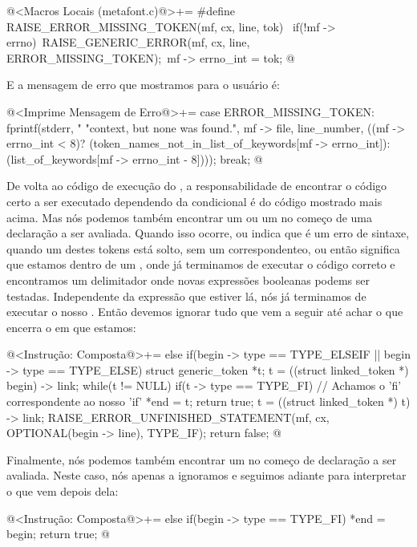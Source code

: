 {{{{{{\iniciocodigo
@<Macros Locais (metafont.c)@>+=
#define RAISE_ERROR_MISSING_TOKEN(mf, cx, line, tok) {\
  if(!mf -> errno){\
    RAISE_GENERIC_ERROR(mf, cx, line, ERROR_MISSING_TOKEN);\
    mf -> errno_int = tok;}}
@
\fimcodigo

E a mensagem de erro que mostramos para o usuário é:

\iniciocodigo
@<Imprime Mensagem de Erro@>+=
case ERROR_MISSING_TOKEN:
  fprintf(stderr, "%
          "context, but none was found.", mf -> file, line_number,
          ((mf -> errno_int < 8)?
          (token_names_not_in_list_of_keywords[mf -> errno_int]):
          (list_of_keywords[mf -> errno_int - 8])));
  break;
@
\fimcodigo


De volta ao código de execução do , a responsabilidade
de encontrar o código certo a ser executado dependendo da condicional
é do código mostrado mais acima. Mas nós podemos também encontrar
um \monoespaco{elseif} ou um \monoespaco{else} no começo de uma
declaração a ser avaliada. Quando isso ocorre, ou indica que é um erro
de sintaxe, quando um destes tokens está solto, sem um 
correspondenteo, ou então significa que estamos dentro de
um , onde já terminamos de executar o código correto e
encontramos um delimitador onde novas expressões booleanas podems ser
testadas. Independente da expressão que estiver lá, nós já terminamos
de executar o nosso \monoespaco{if}. Então devemos ignorar tudo que
vem a seguir até achar o \monoespaco{fi} que encerra o \monoespaco{if}
em que estamos:

\iniciocodigo
@<Instrução: Composta@>+= 
else if(begin -> type == TYPE_ELSEIF || begin -> type == TYPE_ELSE){
  struct generic_token *t;
  t = ((struct linked_token *) begin) -> link;
  while(t != NULL){
    if(t -> type == TYPE_FI){
      // Achamos o 'fi' correspondente ao nosso 'if'
      *end = t;
      return true;
    }
    t = ((struct linked_token *) t) -> link;
  }
  RAISE_ERROR_UNFINISHED_STATEMENT(mf, cx, OPTIONAL(begin -> line),
                                   TYPE_IF);
  return false;
}
@
\fimcodigo

Finalmente, nós podemos também encontrar um  no começo
de declaração a ser avaliada. Neste caso, nós apenas a ignoramos e
seguimos adiante para interpretar o que vem depois dela:

\iniciocodigo
@<Instrução: Composta@>+=
else if(begin -> type == TYPE_FI){
  *end = begin;
  return true;
}
@
\fimcodigo

}}}}}}
